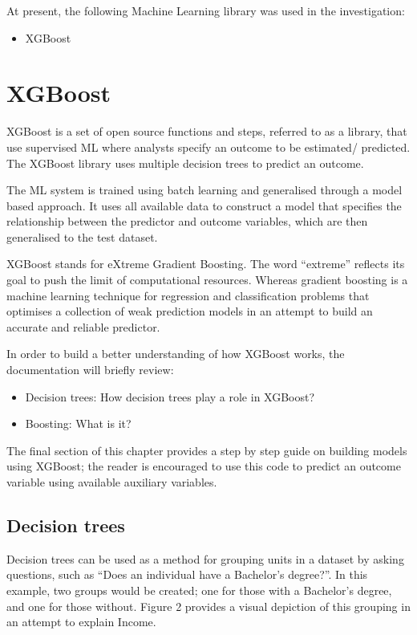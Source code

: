 \documentclass[]{book}
\providecommand{\tightlist}{%
  \setlength{\itemsep}{0pt}\setlength{\parskip}{0pt}}
\begin{document}
At present, the following Machine Learning library was used in the
investigation:

\begin{itemize}
\tightlist
\item
  XGBoost
\end{itemize}

\chapter{XGBoost}\label{xgboost}

XGBoost is a set of open source functions and steps, referred to as a
library, that use supervised ML where analysts specify an outcome to be
estimated/ predicted. The XGBoost library uses multiple decision trees
to predict an outcome.

The ML system is trained using batch learning and generalised through a
model based approach. It uses all available data to construct a model
that specifies the relationship between the predictor and outcome
variables, which are then generalised to the test dataset.

XGBoost stands for eXtreme Gradient Boosting. The word ``extreme''
reflects its goal to push the limit of computational resources. Whereas
gradient boosting is a machine learning technique for regression and
classification problems that optimises a collection of weak prediction
models in an attempt to build an accurate and reliable predictor.

In order to build a better understanding of how XGBoost works, the
documentation will briefly review:

\begin{itemize}
\tightlist
\item
  Decision trees: How decision trees play a role in XGBoost?\\
\item
  Boosting: What is it?
\end{itemize}

The final section of this chapter provides a step by step guide on
building models using XGBoost; the reader is encouraged to use this code
to predict an outcome variable using available auxiliary variables.

\section{Decision trees}\label{decision-trees}

Decision trees can be used as a method for grouping units in a dataset
by asking questions, such as ``Does an individual have a Bachelor's
degree?''. In this example, two groups would be created; one for those
with a Bachelor's degree, and one for those without. Figure 2 provides a
visual depiction of this grouping in an attempt to explain Income.
\end{document}
